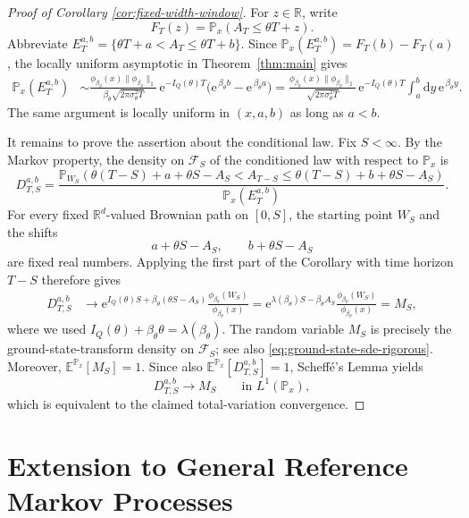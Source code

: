 \documentclass[11pt,reqno]{amsart}
\theoremstyle{definition}
\numberwithin{equation}{section}
\newcommand{\<}{\langle}
\renewcommand{\>}{\rangle}
\def\de{{\rm d}}
\def\de{{\mathrm {d}}}
\def\bbP{{\mathbb{P}}}
\begin{document}
\begin{proof}[Proof of Corollary \ref{cor:fixed-width-window}]
For $z\in\mathbb R$, write
\[
    F_T(z)=\mathbb P_x(A_T\leq\theta T+z).
\]
Abbreviate $E_T ^{a,b} = \{\theta T+a<A_T\leq \theta T+b \}$. Since
$\mathbb P_x(E_T^{a,b})=F_T(b)-F_T(a)$,
the locally uniform asymptotic in Theorem~\ref{thm:main} gives
\begin{align*}
\mathbb P_x(E_T^{a,b})
&\sim
\frac{\phi_{\beta_\theta}(x)\|\phi_{\beta_\theta}\|_1}
     {\beta_\theta\sqrt{2\pi\sigma_\theta^2T}}\,
\mathrm e^{-I_Q(\theta)T}
\bigl(\mathrm e^{\,\beta_\theta b}-\mathrm e^{\,\beta_\theta a}\bigr) 
=
\frac{\phi_{\beta_\theta}(x)\|\phi_{\beta_\theta}\|_1}
     {\sqrt{2\pi\sigma_\theta^2T}}\,
\mathrm e^{-I_Q(\theta)T}
\int_a^b \de y \, \mathrm e^{\, \beta_\theta y}.
\end{align*}
The same argument is locally uniform in $(x,a,b)$ as long as $a<b$.

It remains to prove the assertion about the conditional law.  Fix
$S<\infty$.  By the Markov property, the density on $\mathcal F_S$ of
the conditioned law with respect to $\mathbb P_x$ is
\[
D_{T,S}^{a,b}
=
\frac{
\mathbb P_{W_S}\!\left(
\theta(T-S)+a+\theta S-A_S<A_{T-S}
\leq\theta(T-S)+b+\theta S-A_S
\right)}
{\mathbb P_x(E_T^{a,b})}.
\]
For every fixed $\mathbb R^d$-valued Brownian path on $[0,S]$, the starting point $W_S$ and
the shifts
\[
    a+\theta S-A_S,
    \qquad
    b+\theta S-A_S
\]
are fixed real numbers.  Applying the first part of the Corollary with
time horizon $T-S$ therefore gives
\begin{align*}
D_{T,S}^{a,b}
&\longrightarrow
\mathrm e^{I_Q(\theta)S+\beta_\theta(\theta S-A_S)}
\frac{\phi_{\beta_\theta}(W_S)}
     {\phi_{\beta_\theta}(x)}  
=
\mathrm e^{\lambda(\beta_\theta)S-\beta_\theta A_S}
\frac{\phi_{\beta_\theta}(W_S)}
     {\phi_{\beta_\theta}(x)}
=M_S,
\end{align*}
where we used
    $I_Q(\theta)+\beta_\theta\theta
    =\lambda(\beta_\theta)$.
The random variable $M_S$ is precisely the ground-state-transform
density on $\mathcal F_S$; see also \eqref{eq:ground-state-sde-rigorous}.  Moreover, $\mathbb E^{\bbP_x}[M_S]=1$.
Since also $\mathbb E^{\bbP_x}[D_{T,S}^{a,b}]=1$, Scheff\'e's Lemma yields
\[
    D_{T,S}^{a,b}\longrightarrow M_S
    \qquad\text{in }L^1(\mathbb P_x),
\]
which is equivalent to the claimed total-variation convergence.
\end{proof}


\section{Extension to General Reference Markov Processes}
\label{sec:examples}
\end{document}
